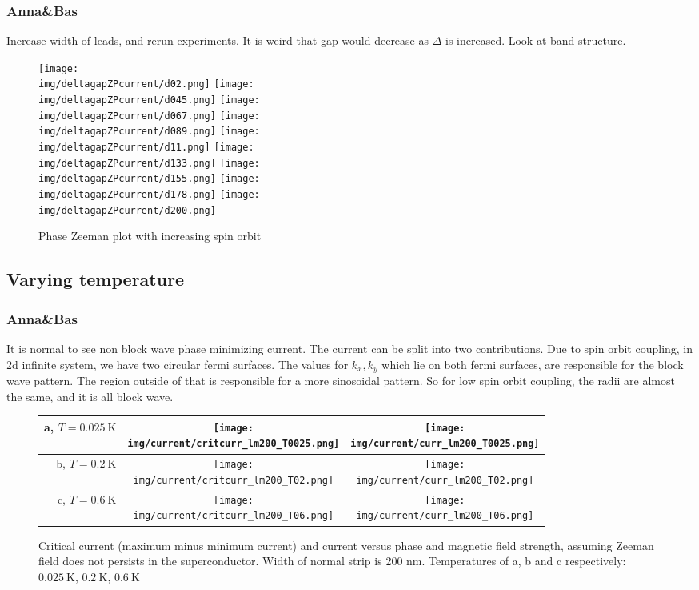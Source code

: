 \documentclass[10pt,a4paper]{article}
\newcommand{\kx}{k_x}
\newcommand{\ky}{k_y}
\newcommand{\img}{./images}
\begin{document}
	\subsubsection{Anna\&Bas}
	Increase width of leads, and rerun experiments. It is weird that gap would decrease as $\Delta$ is increased. Look at band structure.
		\begin{figure}[H]
			\texttt{[image: \\img/deltagapZPcurrent/d02.png]}
			\texttt{[image: \\img/deltagapZPcurrent/d045.png]}
			\texttt{[image: \\img/deltagapZPcurrent/d067.png]}
			\texttt{[image: \\img/deltagapZPcurrent/d089.png]}
			\texttt{[image: \\img/deltagapZPcurrent/d11.png]}
			\texttt{[image: \\img/deltagapZPcurrent/d133.png]}
			\texttt{[image: \\img/deltagapZPcurrent/d155.png]}
			\texttt{[image: \\img/deltagapZPcurrent/d178.png]}
			\texttt{[image: \\img/deltagapZPcurrent/d200.png]}
			\caption{Phase Zeeman plot with increasing spin orbit}
		\end{figure}
\newpage
	\subsection{Varying temperature}
	\subsubsection{Anna\&Bas}
	It is normal to see non block wave phase minimizing current. The current can be split into two contributions. 
	Due to spin orbit coupling, in 2d infinite system, we have two circular fermi surfaces. The values for $\kx,\ky$ which lie on both fermi surfaces, are responsible for the block wave pattern. The region outside of that is responsible for a more sinosoidal pattern.
	So for low spin orbit coupling, the radii are almost the same, and it is all block wave.
		\begin{figure}[H]
			\begin{tabular}{rcc}
				a, $T=\SI{0.025}{\K}$&\texttt{[image: \\img/current/critcurr\_lm200\_T0025.png]}&
				\texttt{[image: \\img/current/curr\_lm200\_T0025.png]}\\
				\hline
				b, $T=\SI{0.2}{\K}$&\texttt{[image: \\img/current/critcurr\_lm200\_T02.png]}&
				\texttt{[image: \\img/current/curr\_lm200\_T02.png]}\\
				\hline
				c, $T=\SI{0.6}{\K}$&\texttt{[image: \\img/current/critcurr\_lm200\_T06.png]}&
				\texttt{[image: \\img/current/curr\_lm200\_T06.png]}\\
				\hline
			\end{tabular}
			\caption{Critical current (maximum minus minimum current) and current versus phase and magnetic field strength, assuming Zeeman field does not persists in the superconductor. Width of normal strip is 200 nm. Temperatures of a, b and c respectively: $\SI{0.025}{\K}$, $\SI{0.2}{\K}$, $\SI{0.6}{\K}$}
		\end{figure}
	
\end{document}
